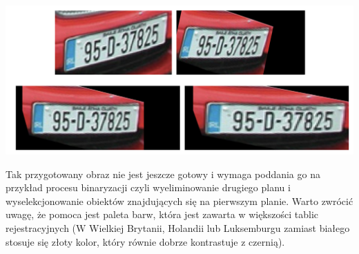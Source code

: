 \documentclass{article}
\begin{document}
\begin{center}
	\includegraphics[width=15cm]{plates}
\end{center}
\par
Tak przygotowany obraz nie jest jeszcze gotowy i wymaga poddania go na przykład procesu binaryzacji czyli wyeliminowanie drugiego planu i wyselekcjonowanie obiektów znajdujących się na pierwszym planie. Warto zwrócić uwagę, że pomoca jest paleta barw, która jest zawarta w większości tablic rejestracyjnych (W Wielkiej Brytanii, Holandii lub Luksemburgu zamiast białego stosuje się złoty kolor, który równie dobrze kontrastuje z czernią).
\end{document}
